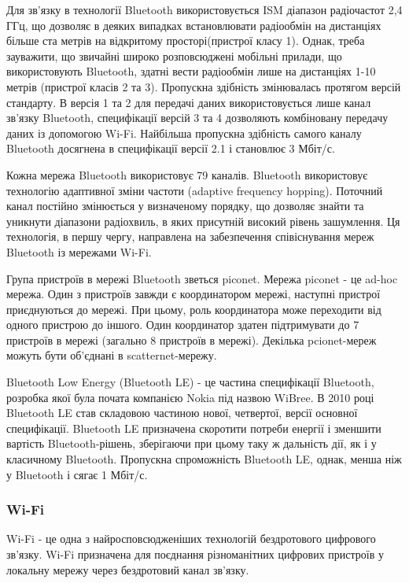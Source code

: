 \documentclass[a4paper,ukrainian,utf8,nocolumnsxix,floatsection,equationsection]{eskdtext}
\renewcommand\paragraph{\subsubsection}
\begin{document}
Для зв’язку в технології Bluetooth використовується ISM діапазон радіочастот 2,4 ГГц, що дозволяє в деяких випадках встановлювати радіообмін на дистанціях більше ста метрів на відкритому просторі(пристрої класу 1). Однак, треба зауважити, що звичайні широко розповсюджені мобільні прилади, що використовують Bluetooth, здатні вести радіообмін лише на дистанціях 1-10 метрів (пристрої класів 2 та 3). Пропускна здібність змінювалась протягом версій стандарту. В версія 1 та 2 для передачі даних використовується лише канал зв’язку Bluetooth, специфікації версій 3 та 4 дозволяють комбіновану передачу даних із допомогою Wi-Fi. Найбільша пропускна здібність самого каналу Bluetooth досягнена в специфікації версії 2.1 \cite{bluetooth:core:spec:2_1} і становлює 3 Мбіт/с.

Кожна мережа Bluetooth використовує 79 каналів. Bluetooth використовує технологію адаптивної зміни частоти (adaptive frequency hopping). Поточний канал постійно змінюється у визначеному порядку, що дозволяє знайти та уникнути діапазони радіохвиль, в яких присутній високий рівень зашумлення. Ця технологія, в першу чергу, направлена на забезпечення співіснування мереж Bluetooth із мережами Wi-Fi.

Група пристроїв в мережі Bluetooth зветься piconet. Мережа piconet - це ad-hoc мережа. Один з пристроїв завжди є координатором мережі, наступні пристрої приєднуються до мережі. При цьому, роль координатора може переходити від одного пристрою до іншого. Один координатор здатен підтримувати до 7 пристроїв в мережі (загально 8 пристроїв в мережі). Декілька pcionet-мереж можуть бути об’єднані в scatternet-мережу.

Bluetooth Low Energy (Bluetooth LE) - це частина специфікації Bluetooth, розробка якої була почата  компанією Nokia під назвою WiBree. В 2010 році Bluetooth LE став складовою частиною нової, четвертої, версії основної специфікації. Bluetooth LE призначена скоротити потреби енергії і зменшити вартість Bluetooth-рішень, зберігаючи при цьому таку ж дальність дії, як і у класичному Bluetooth. Пропускна спроможність Bluetooth LE, однак, менша ніж у Bluetooth і сягає 1 Мбіт/с.


\paragraph{Wi-Fi} %
\label{par:wi_fi}

Wi-Fi - це одна з найросповсюдженіших технологій бездротового цифрового зв’язку. Wi-Fi призначена для поєднання різноманітних цифрових пристроїв у локальну мережу через бездротовий канал зв’язку. 
\end{document}

